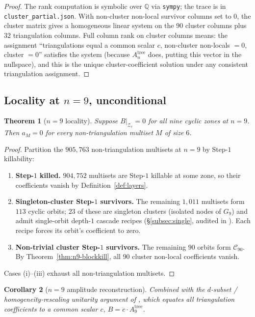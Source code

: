 \documentclass[11pt]{article}
\newtheorem{thm}{Theorem}
\newtheorem{cor}[thm]{Corollary}
\theoremstyle{definition}
\begin{document}
\begin{proof}
The rank computation is symbolic over $\mathbb Q$ via
\texttt{sympy}; the trace is in
\verb|cluster_partial.json|. With non-cluster non-local survivor
columns set to $0$, the cluster matrix gives a homogeneous linear
system on the $90$ cluster columns plus $32$ triangulation columns.
Full column rank on cluster columns means: the assignment
``triangulations equal a common scalar $c$, non-cluster non-locals
$=0$, cluster $=0$'' satisfies the system (because
$A_n^{\mathrm{tree}}$ does, putting this vector in the nullspace),
and this is the unique cluster-coefficient solution under any
consistent triangulation assignment.
\end{proof}

\subsection{Locality at $n=9$, unconditional}\label{subsec:locality}

\begin{thm}[$n=9$ locality]\label{thm:n9-locality}
Suppose $B\big|_{\mathcal Z_r}=0$ for all nine cyclic zones at
$n=9$. Then $a_M=0$ for every non-triangulation multiset $M$ of
size $6$.
\end{thm}

\begin{proof}
Partition the $905{,}763$ non-triangulation multisets at $n=9$ by
Step-$1$ killability:
\begin{enumerate}[label=(\roman*),leftmargin=2em]
\item \textbf{Step-$1$ killed.} $904{,}752$ multisets are
Step-$1$ killable at some zone, so their coefficients vanish by
Definition~\ref{def:layers}.
\item \textbf{Singleton-cluster Step-$1$ survivors.} The remaining
$1{,}011$ multisets form $113$ cyclic orbits; $23$ of these are
singleton clusters (isolated nodes of $G_9$) and admit single-orbit
depth-$1$ cascade recipes (\S\ref{subsec:single}, audited in
\cite{n9status}). Each recipe forces its orbit's coefficient to
zero.
\item \textbf{Non-trivial cluster Step-$1$ survivors.} The remaining
$90$ orbits form $\mathcal C_{90}$. By
Theorem~\ref{thm:n9-blockkill}, all $90$ cluster non-local
coefficients vanish.
\end{enumerate}
Cases (i)--(iii) exhaust all non-triangulation multisets.
\end{proof}

\begin{cor}[$n=9$ amplitude reconstruction]\label{cor:n9-amp}
Combined with the $d$-subset / homogeneity-rescaling unitarity
argument of \cite{notes11,notes18,subsetvan}, which equates all
triangulation coefficients to a common scalar $c$,
$B=c\cdot A_9^{\mathrm{tree}}$.
\end{cor}
\end{document}
